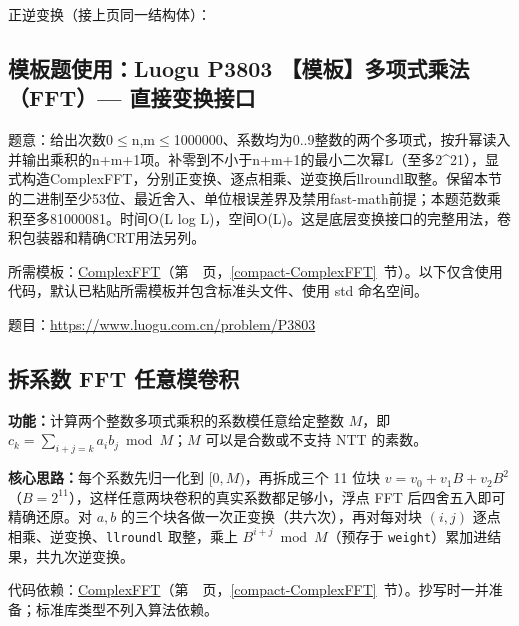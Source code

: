 \Needspace{321pt}



\newpage

\noindent 正逆变换（接上页同一结构体）：



\Needspace{425pt}

\subsection*{模板题使用：Luogu P3803 【模板】多项式乘法（FFT）— 直接变换接口}

\label{usage-example-222}

题意：给出次数0$\le$n,m$\le$1000000、系数均为0..9整数的两个多项式，按升幂读入并输出乘积的n+m+1项。补零到不小于n+m+1的最小二次幂L（至多2\textasciicircum{}21），显式构造ComplexFFT，分别正变换、逐点相乘、逆变换后llroundl取整。保留本节的二进制至少53位、最近舍入、单位根误差界及禁用fast-math前提；本题范数乘积至多81000081。时间O(L log L)，空间O(L)。这是底层变换接口的完整用法，卷积包装器和精确CRT用法另列。

所需模板：\hyperref[compact-ComplexFFT]{ComplexFFT}（第~\pageref{compact-ComplexFFT}~页，\ref{compact-ComplexFFT}~节）。以下仅含使用代码，默认已粘贴所需模板并包含标准头文件、使用 std 命名空间。

题目：\url{https://www.luogu.com.cn/problem/P3803}



\subsection{拆系数 FFT 任意模卷积}\label{compact-convolution_mod_fft}

\noindent\textbf{功能：}\allowbreak 计算两个整数多项式乘积的系数模任意给定整数 $M$，即 $c_k=\sum_{i+j=k}a_ib_j\bmod M$；$M$ 可以是合数或不支持 NTT 的素数。

\textbf{核心思路：}\allowbreak 每个系数先归一化到 $[0,M)$，再拆成三个 11 位块 $v=v_0+v_1B+v_2B^2$（$B=2^{11}$），这样任意两块卷积的真实系数都足够小，浮点 FFT 后四舍五入即可精确还原。对 $a,b$ 的三个块各做一次正变换（共六次），再对每对块 $(i,j)$ 逐点相乘、逆变换、\texttt{llroundl} 取整，乘上 $B^{i+j}\bmod M$（预存于 \texttt{weight}）累加进结果，共九次逆变换。

代码依赖：\hyperref[compact-ComplexFFT]{ComplexFFT}（第~\pageref{compact-ComplexFFT}~页，\ref{compact-ComplexFFT}~节）。抄写时一并准备；标准库类型不列入算法依赖。

